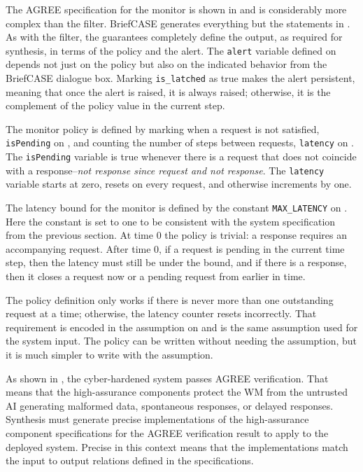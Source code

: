 The AGREE specification for the monitor is shown in  and is considerably more complex than the filter.
BriefCASE generates everything but the statements in .
As with the filter, the guarantees completely define the output, as required for synthesis, in terms of the policy and the alert.
The \texttt{alert} variable defined on  depends not just on the policy but also on the indicated behavior from the BriefCASE dialogue box. 
Marking \texttt{is\_latched} as true makes the alert persistent, meaning that once the alert is raised, it is always raised; otherwise, it is the complement of the policy value in the current step.

The monitor policy is defined by marking when a request is not satisfied, \texttt{isPending} on , and counting the number of steps between requests, \texttt{latency} on .
The \texttt{isPending} variable is true whenever there is a request that does not coincide with a response--\emph{not response since request and not response}.
The \texttt{latency} variable starts at zero, resets on every request, and otherwise increments by one.

The latency bound for the monitor is defined by the constant \texttt{MAX\_LATENCY} on .
Here the constant is set to one to be consistent with the system specification from the previous section.
At time 0 the policy is trivial: a response requires an accompanying request.
After time 0, if a request is pending in the current time step, then the latency must still be under the bound, and if there is a response, then it closes a request now or a pending request from earlier in time.

The policy definition only works if there is never more than one outstanding request at a time; otherwise, the latency counter resets incorrectly.
That requirement is encoded in the assumption on  and is the same assumption used for the system input.
The policy can be written without needing the assumption, but it is much simpler to write with the assumption.

As shown in , the cyber-hardened system passes AGREE verification.
That means that the high-assurance components protect the WM from the untrusted AI generating malformed data, spontaneous responses, or delayed responses.
Synthesis must generate precise implementations of the high-assurance component specifications for the AGREE verification result to apply to the deployed system.
Precise in this context means that the implementations match the input to output relations defined in the specifications.
